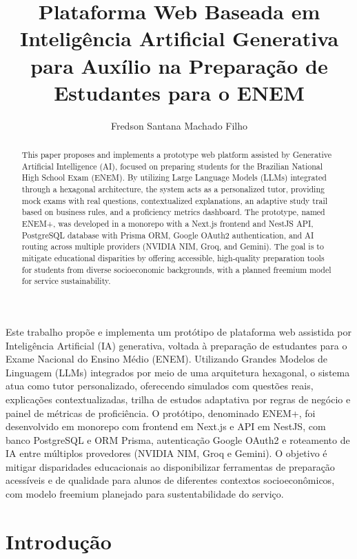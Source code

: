 \documentclass[12pt]{article}
\title{Plataforma Web Baseada em Inteligência Artificial Generativa para Auxílio na Preparação de Estudantes para o ENEM}
\author{Fredson Santana Machado Filho\inst{1}}
\begin{document}
\maketitle

\begin{resumo}
  Este trabalho propõe e implementa um protótipo de plataforma web assistida por Inteligência Artificial (IA) generativa, voltada à preparação de estudantes para o Exame Nacional do Ensino Médio (ENEM). Utilizando Grandes Modelos de Linguagem (LLMs) integrados por meio de uma arquitetura hexagonal, o sistema atua como tutor personalizado, oferecendo simulados com questões reais, explicações contextualizadas, trilha de estudos adaptativa por regras de negócio e painel de métricas de proficiência. O protótipo, denominado ENEM+, foi desenvolvido em monorepo com frontend em Next.js e API em NestJS, com banco PostgreSQL e ORM Prisma, autenticação Google OAuth2 e roteamento de IA entre múltiplos provedores (NVIDIA NIM, Groq e Gemini). O objetivo é mitigar disparidades educacionais ao disponibilizar ferramentas de preparação acessíveis e de qualidade para alunos de diferentes contextos socioeconômicos, com modelo freemium planejado para sustentabilidade do serviço.
\end{resumo}

\begin{abstract}
  This paper proposes and implements a prototype web platform assisted by Generative Artificial Intelligence (AI), focused on preparing students for the Brazilian National High School Exam (ENEM). By utilizing Large Language Models (LLMs) integrated through a hexagonal architecture, the system acts as a personalized tutor, providing mock exams with real questions, contextualized explanations, an adaptive study trail based on business rules, and a proficiency metrics dashboard. The prototype, named ENEM+, was developed in a monorepo with a Next.js frontend and NestJS API, PostgreSQL database with Prisma ORM, Google OAuth2 authentication, and AI routing across multiple providers (NVIDIA NIM, Groq, and Gemini). The goal is to mitigate educational disparities by offering accessible, high-quality preparation tools for students from diverse socioeconomic backgrounds, with a planned freemium model for service sustainability.
\end{abstract}

\section{Introdução}
\end{document}
